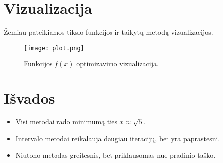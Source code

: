 \documentclass[a4paper,12pt]{article}
\begin{document}
\section{Vizualizacija}
Žemiau pateikiamos tikslo funkcijos ir taikytų metodų vizualizacijos.

\begin{figure}[H]
    \centering
    \texttt{[image: plot.png]}
    \caption{Funkcijos $f(x)$ optimizavimo vizualizacija.}
\end{figure}

\section{Išvados}
\begin{itemize}
    \item Visi metodai rado minimumą ties $x \approx \sqrt{5}$.
    \item Intervalo metodai reikalauja daugiau iteracijų, bet yra paprastesni.
    \item Niutono metodas greitesnis, bet priklausomas nuo pradinio taško.
\end{itemize}
\end{document}
